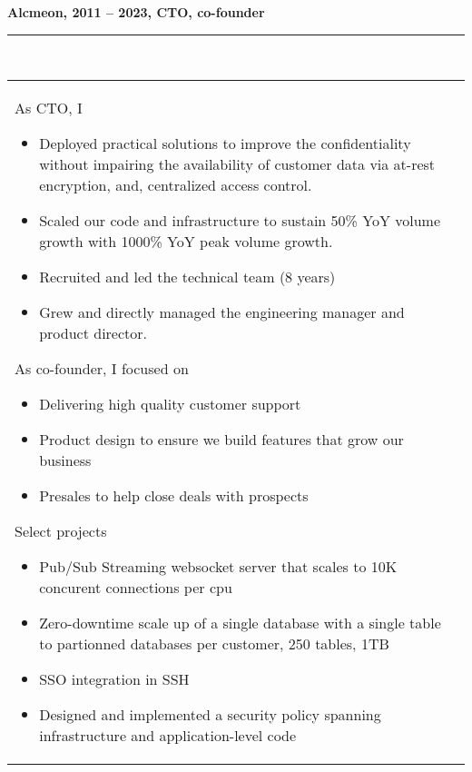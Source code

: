 \documentclass[a4paper,12pt]{article}
\newcommand{\ligne}[1]{\rule[0.5ex]{\textwidth}{#1}\\}
\newcommand{\styleRub}[1]{\textbf{\large #1}\par}
\newcommand{\indentStd}{\noindent\hspace*{10pt}}
\newenvironment{rubrique}[2][\linewidth]%
{\styleRub{#2}%
\ligne{0.5mm}
\setlength{\lenB}{#1}%
\setlength{\lenC}{\linewidth}%
\addtolength{\lenC}{-\lenA}%
\addtolength{\lenC}{-\lenB}%
\addtolength{\lenC}{-19pt}
\indentStd\begin{tabular}[t]{p{\lenB}p{\lenC}}}
{\end{tabular}}
\newlength{\lenA} %
\newlength{\lenB} %
\newlength{\lenC} %
\begin{document}
\vspace{0.5cm}
\begin{rubrique}{Alcmeon, 2011 -- 2023, CTO, co-founder}

As CTO, I 
\begin{itemize}
\item Deployed practical solutions to improve the confidentiality 
        without impairing the availability of customer data via 
        at-rest encryption, and, centralized access control.
\item Scaled our code and infrastructure to sustain
        50\% YoY volume growth with 1000\% YoY peak volume growth.
\item Recruited and led the technical team (8 years)
\item Grew and directly managed the engineering manager and product
        director.
\end{itemize}


As co-founder, I focused on
\begin{itemize}
\item Delivering high quality customer support
\item Product design to ensure we build features that grow our business
\item Presales to help close deals with prospects
\end{itemize}

Select projects
\begin{itemize}
\item Pub/Sub Streaming websocket server that scales to 10K concurent connections per cpu
\item Zero-downtime scale up of a single database with a single table to partionned
 databases per customer, 250 tables, 1TB
\item SSO integration in SSH
\item Designed and implemented a security policy spanning 
infrastructure and application-level code
\end{itemize}

\end{rubrique}
\pagebreak
\end{document}
